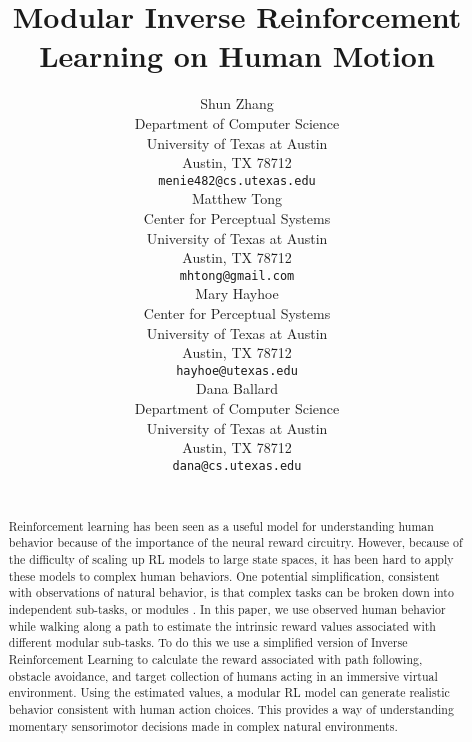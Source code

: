 \documentclass[11pt]{article} %
\title{Modular Inverse Reinforcement Learning on Human Motion}
\author{
Shun Zhang\\
Department of Computer Science\\
University of Texas at Austin\\
Austin, TX 78712 \\
\texttt{menie482@cs.utexas.edu} \\
\And
Matthew Tong \\
Center for Perceptual Systems\\
University of Texas at Austin\\
Austin, TX 78712 \\
\texttt{mhtong@gmail.com} \\
\AND
Mary Hayhoe \\
Center for Perceptual Systems\\
University of Texas at Austin\\
Austin, TX 78712 \\
\texttt{hayhoe@utexas.edu} \\
\And
Dana Ballard \\
Department of Computer Science\\
University of Texas at Austin\\
Austin, TX 78712 \\
\texttt{dana@cs.utexas.edu} \\
\\
}
\begin{document}
\maketitle

\begin{abstract}
Reinforcement learning has been seen as a useful model for understanding human
behavior because of the importance of the neural reward circuitry. However,
because of the difficulty of scaling up RL models to large state spaces, it has
been hard to apply these models to complex human behaviors. One potential
simplification, consistent with observations of natural behavior, is that
complex tasks can be broken down into independent sub-tasks, or modules . In
this paper, we use observed human behavior while walking along a path to
estimate the intrinsic reward values associated with different modular
sub-tasks. To do this we use a simplified version of Inverse Reinforcement
Learning to calculate the reward associated with path following, obstacle
avoidance, and target collection of humans acting in an immersive virtual
environment. Using the estimated values, a modular RL model can generate
realistic behavior consistent with human action choices. This provides a way of
understanding momentary sensorimotor decisions made in complex natural
environments.
\end{abstract}


\startmain %





\end{document}
